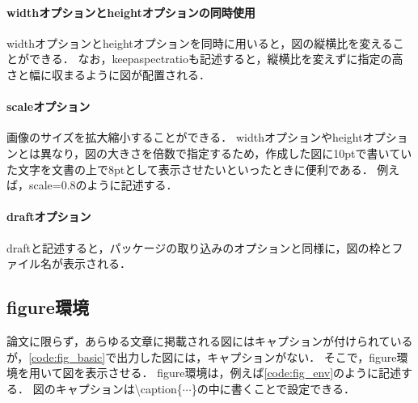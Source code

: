 \paragraph{widthオプションとheightオプションの同時使用\\}

widthオプションとheightオプションを同時に用いると，図の縦横比を変えることができる．
なお，keepaspectratioも記述すると，縦横比を変えずに指定の高さと幅に収まるように図が配置される．

\paragraph{scaleオプション\\}

画像のサイズを拡大縮小することができる．
widthオプションやheightオプションとは異なり，図の大きさを倍数で指定するため，作成した図に10ptで書いていた文字を文書の上で8ptとして表示させたいといったときに便利である．
例えば，scale=0.8のように記述する．

\paragraph{draftオプション\\}

draftと記述すると，パッケージの取り込みのオプションと同様に，図の枠とファイル名が表示される．

\subsection{figure環境}

論文に限らず，あらゆる文章に掲載される図にはキャプションが付けられているが，\code\ref{code:fig_basic}で出力した図には，キャプションがない．
そこで，figure環境を用いて図を表示させる．
figure環境は，例えば\code\ref{code:fig_env}のように記述する．
図のキャプションは\textbackslash caption\{$\cdots$\}の中に書くことで設定できる．

